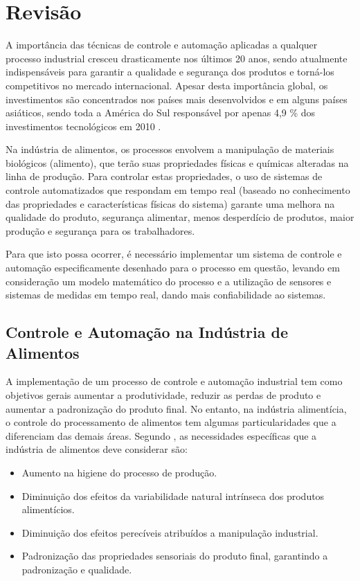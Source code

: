 \chapter{Revisão}\label{revisão}

A importância das técnicas de controle e automação aplicadas a qualquer processo industrial cresceu drasticamente nos últimos 20 anos, sendo atualmente indispensáveis para garantir a qualidade e segurança dos produtos e torná-los competitivos no mercado internacional. Apesar desta importância global, os investimentos são concentrados nos países mais desenvolvidos e em alguns países asiáticos, sendo toda a América do Sul responsável por apenas 4,9 \% dos investimentos tecnológicos em 2010 \citep{future-trends}.

Na indústria de alimentos, os processos envolvem a manipulação de materiais biológicos (alimento), que terão suas propriedades físicas e químicas alteradas na linha de produção. Para controlar estas propriedades, o uso de sistemas de controle automatizados que respondam em tempo real (baseado no conhecimento das propriedades e características físicas do sistema) garante  uma melhora na qualidade do produto, segurança alimentar, menos desperdício de produtos, maior produção e segurança para os trabalhadores.
	
Para que isto possa ocorrer, é necessário implementar um sistema de controle e automação especificamente desenhado para o processo em questão, levando em consideração um modelo matemático do processo e a utilização de sensores e sistemas de medidas em tempo real, dando mais confiabilidade ao sistemas. 

\section{Controle e Automação na Indústria de Alimentos}\label{controle_e_automacao}
 
A implementação de um processo de controle e automação industrial tem como objetivos gerais aumentar a produtividade, reduzir as perdas de produto e aumentar a padronização do produto final. No entanto, na indústria alimentícia, o controle do processamento de alimentos tem algumas particularidades que a diferenciam das demais áreas. Segundo \citet{food-processing-control}, as necessidades específicas que a indústria de alimentos deve considerar são:

\begin{itemize}
  \item Aumento na higiene do processo de produção.
  \item Diminuição dos efeitos da variabilidade natural intrínseca dos produtos alimentícios.
  \item Diminuição dos efeitos perecíveis atribuídos a manipulação industrial.
  \item Padronização das propriedades sensoriais do produto final, garantindo a padronização e qualidade. 
\end{itemize}

